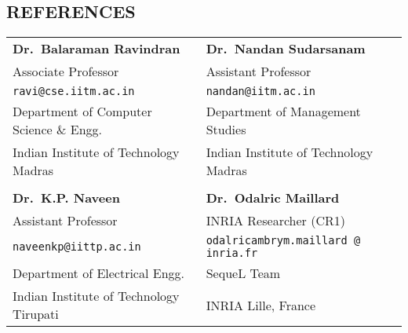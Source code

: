 \documentclass[margin,11pt]{res}
\begin{document}
\begin{resume}
\section{REFERENCES}
\begin{tabular}{lll}
\textbf{Dr.~Balaraman Ravindran} & \textbf{Dr.~Nandan Sudarsanam} \\
Associate Professor & Assistant Professor\\
\texttt{ravi@cse.iitm.ac.in} & \texttt{nandan@iitm.ac.in}\\
Department of Computer Science \& Engg. & Department of Management Studies\\ 
Indian Institute of Technology Madras & Indian Institute of Technology Madras\\
\\
\textbf{Dr.~K.P. Naveen}  & \textbf{Dr.~Odalric Maillard} \\
Assistant Professor & INRIA Researcher (CR1) \\
\texttt{naveenkp@iittp.ac.in} & \texttt{odalricambrym.maillard @ inria.fr}\\
Department of Electrical Engg. & SequeL Team \\ 
Indian Institute of Technology Tirupati & INRIA Lille, France

\end{tabular}



\end{resume}
\end{document}
